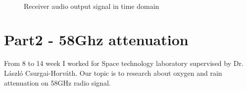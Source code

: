 \documentclass[
11pt, %
a4paper, %
oneside, %
headinclude,footinclude, %
BCOR5mm, %
]{scrartcl}
\begin{document}
\begin{figure}[h!]
    \centering
     \quad
     \\
 
    \caption{Receiver audio output signal in time domain}
    \label{fig:Receiver audio output}
  \end{figure}

\newpage

\section{Part2 - 58Ghz attenuation}
From 8 to 14 week I worked for Space technology laboratory supervised by Dr. László Csurgai-Horváth.
Our topic is to research about oxygen and rain attenuation on 58GHz radio signal.
\end{document}
